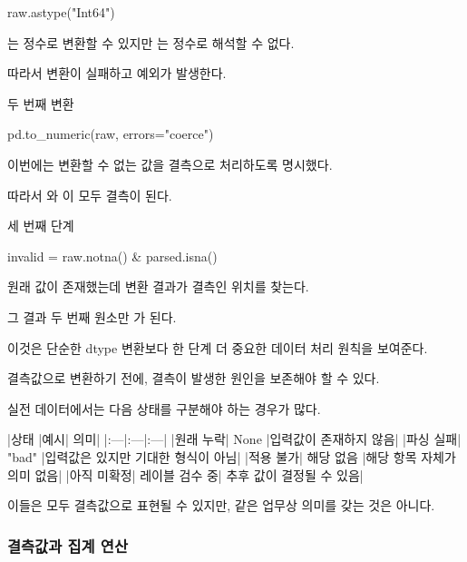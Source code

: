 \begin{dhkcode}
raw.astype("Int64")
\end{dhkcode}

는 정수로 변환할 수 있지만 는 정수로 해석할 수 없다.

따라서 변환이 실패하고 예외가 발생한다.

\begin{dhknote}
\begin{dhksmry}[centered]
두 번째 변환
\end{dhksmry}
\end{dhknote}

\begin{dhkcode}
pd.to_numeric(raw, errors="coerce")
\end{dhkcode}

이번에는 변환할 수 없는 값을 결측으로 처리하도록 명시했다.

따라서 와 이 모두 결측이 된다.

\begin{dhknote}
\begin{dhksmry}[centered]
세 번째 단계
\end{dhksmry}
\end{dhknote}

\begin{dhkcode}
invalid = raw.notna() & parsed.isna()
\end{dhkcode}

원래 값이 존재했는데 변환 결과가 결측인 위치를 찾는다.

그 결과 두 번째 원소만 가 된다.

이것은 단순한 dtype 변환보다 한 단계 더 중요한 데이터 처리 원칙을 보여준다.

결측값으로 변환하기 전에, 결측이 발생한 원인을 보존해야 할 수 있다.

실전 데이터에서는 다음 상태를 구분해야 하는 경우가 많다.

\begin{dhktable}
|상태	|예시|	의미|
|:---|:---|:---|
|원래 누락|	None	|입력값이 존재하지 않음|
|파싱 실패|	"bad"	|입력값은 있지만 기대한 형식이 아님|
|적용 불가|	해당 없음	|해당 항목 자체가 의미 없음|
|아직 미확정|	레이블 검수 중|	추후 값이 결정될 수 있음|
\end{dhktable}

이들은 모두 결측값으로 표현될 수 있지만, 같은 업무상 의미를 갖는 것은 아니다.

\subsubsection{결측값과 집계 연산}

